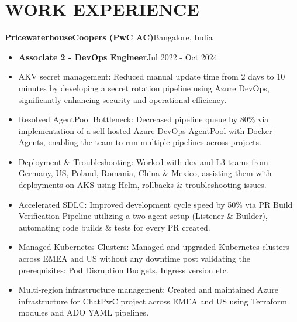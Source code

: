 \documentclass[11pt,a4paper]{article}
\newenvironment{dashlist}{
  \begin{itemize}[label={--}]
}{
  \end{itemize}
}
\begin{document}
\section*{WORK EXPERIENCE}
\noindent\textbf{PricewaterhouseCoopers (PwC AC)}\hfill Bangalore, India
\begin{itemize}
\item \textbf{Associate 2 - DevOps Engineer}\hfill Jul 2022 - Oct 2024
\end{itemize}
\begin{dashlist}
    \item AKV secret management: Reduced manual update time from 2 days to 10 minutes by developing a secret rotation pipeline using Azure DevOps, significantly enhancing security and operational efficiency.
    \item Resolved AgentPool Bottleneck: Decreased pipeline queue by 80\% via implementation of a self-hosted Azure DevOps AgentPool with Docker Agents, enabling the team to run multiple pipelines across projects.
    \item Deployment \& Troubleshooting: Worked with dev and L3 teams from Germany, US, Poland, Romania, China \& Mexico, assisting them with deployments on AKS using Helm, rollbacks \& troubleshooting issues.
    \item Accelerated SDLC: Improved development cycle speed by 50\% via PR Build Verification Pipeline utilizing a two-agent setup (Listener \& Builder), automating code builds \& tests for every PR created.
    \item Managed Kubernetes Clusters: Managed and upgraded Kubernetes clusters across EMEA and US without any downtime post validating the prerequisites: Pod Disruption Budgets, Ingress version etc.
    \item Multi-region infrastructure management: Created and maintained Azure infrastructure for ChatPwC project across EMEA and US using Terraform modules and ADO YAML pipelines.
\end{dashlist}

\medskip
\end{document}
